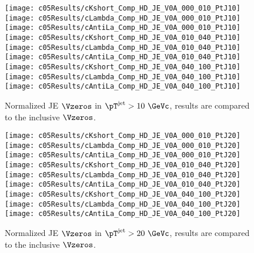 \begin{figure}[htb]
\begin{center}
\texttt{[image: c05Results/cKshort\_Comp\_HD\_JE\_V0A\_000\_010\_PtJ10]}
\texttt{[image: c05Results/cLambda\_Comp\_HD\_JE\_V0A\_000\_010\_PtJ10]}
\texttt{[image: c05Results/cAntiLa\_Comp\_HD\_JE\_V0A\_000\_010\_PtJ10]}
\texttt{[image: c05Results/cKshort\_Comp\_HD\_JE\_V0A\_010\_040\_PtJ10]}
\texttt{[image: c05Results/cLambda\_Comp\_HD\_JE\_V0A\_010\_040\_PtJ10]}
\texttt{[image: c05Results/cAntiLa\_Comp\_HD\_JE\_V0A\_010\_040\_PtJ10]}
\texttt{[image: c05Results/cKshort\_Comp\_HD\_JE\_V0A\_040\_100\_PtJ10]}
\texttt{[image: c05Results/cLambda\_Comp\_HD\_JE\_V0A\_040\_100\_PtJ10]}
\texttt{[image: c05Results/cAntiLa\_Comp\_HD\_JE\_V0A\_040\_100\_PtJ10]}
\caption{Normalized JE $\Vzeros$ in $\pT^{\rm jet}>10~\GeVc$,
         results are compared to the inclusive $\Vzeros$.}
\label{fig:c05RestulsCompHDPtJ10}
\end{center}
\end{figure}

\begin{figure}[htb]
\begin{center}
\texttt{[image: c05Results/cKshort\_Comp\_HD\_JE\_V0A\_000\_010\_PtJ20]}
\texttt{[image: c05Results/cLambda\_Comp\_HD\_JE\_V0A\_000\_010\_PtJ20]}
\texttt{[image: c05Results/cAntiLa\_Comp\_HD\_JE\_V0A\_000\_010\_PtJ20]}
\texttt{[image: c05Results/cKshort\_Comp\_HD\_JE\_V0A\_010\_040\_PtJ20]}
\texttt{[image: c05Results/cLambda\_Comp\_HD\_JE\_V0A\_010\_040\_PtJ20]}
\texttt{[image: c05Results/cAntiLa\_Comp\_HD\_JE\_V0A\_010\_040\_PtJ20]}
\texttt{[image: c05Results/cKshort\_Comp\_HD\_JE\_V0A\_040\_100\_PtJ20]}
\texttt{[image: c05Results/cLambda\_Comp\_HD\_JE\_V0A\_040\_100\_PtJ20]}
\texttt{[image: c05Results/cAntiLa\_Comp\_HD\_JE\_V0A\_040\_100\_PtJ20]}
\caption{Normalized JE $\Vzeros$ in $\pT^{\rm jet}>20~\GeVc$,
         results are compared to the inclusive $\Vzeros$.}
\label{fig:c05RestulsCompHDPtJ20}
\end{center}
\end{figure}
